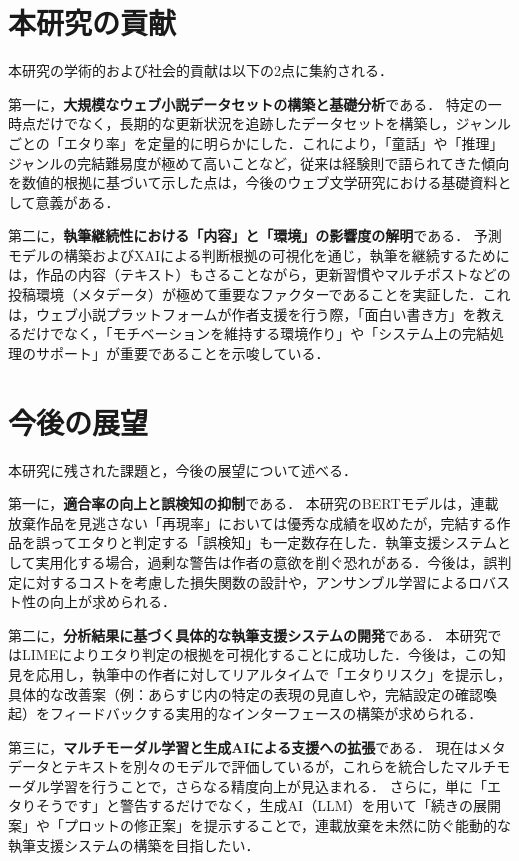 \documentclass[uplatex, dvipdfmx, 11pt, a4paper, report]{jsbook}
\begin{document}
\section{本研究の貢献}
本研究の学術的および社会的貢献は以下の2点に集約される．

第一に，\textbf{大規模なウェブ小説データセットの構築と基礎分析}である．
特定の一時点だけでなく，長期的な更新状況を追跡したデータセットを構築し，ジャンルごとの「エタり率」を定量的に明らかにした．これにより，「童話」や「推理」ジャンルの完結難易度が極めて高いことなど，従来は経験則で語られてきた傾向を数値的根拠に基づいて示した点は，今後のウェブ文学研究における基礎資料として意義がある．

第二に，\textbf{執筆継続性における「内容」と「環境」の影響度の解明}である．
予測モデルの構築およびXAIによる判断根拠の可視化を通じ，執筆を継続するためには，作品の内容（テキスト）もさることながら，更新習慣やマルチポストなどの投稿環境（メタデータ）が極めて重要なファクターであることを実証した．これは，ウェブ小説プラットフォームが作者支援を行う際，「面白い書き方」を教えるだけでなく，「モチベーションを維持する環境作り」や「システム上の完結処理のサポート」が重要であることを示唆している．

\section{今後の展望}
本研究に残された課題と，今後の展望について述べる．

第一に，\textbf{適合率の向上と誤検知の抑制}である．
本研究のBERTモデルは，連載放棄作品を見逃さない「再現率」においては優秀な成績を収めたが，完結する作品を誤ってエタりと判定する「誤検知」も一定数存在した．執筆支援システムとして実用化する場合，過剰な警告は作者の意欲を削ぐ恐れがある．今後は，誤判定に対するコストを考慮した損失関数の設計や，アンサンブル学習によるロバスト性の向上が求められる．

第二に，\textbf{分析結果に基づく具体的な執筆支援システムの開発}である．
本研究ではLIMEによりエタり判定の根拠を可視化することに成功した．今後は，この知見を応用し，執筆中の作者に対してリアルタイムで「エタりリスク」を提示し，具体的な改善案（例：あらすじ内の特定の表現の見直しや，完結設定の確認喚起）をフィードバックする実用的なインターフェースの構築が求められる．

第三に，\textbf{マルチモーダル学習と生成AIによる支援への拡張}である．
現在はメタデータとテキストを別々のモデルで評価しているが，これらを統合したマルチモーダル学習を行うことで，さらなる精度向上が見込まれる．
さらに，単に「エタりそうです」と警告するだけでなく，生成AI（LLM）を用いて「続きの展開案」や「プロットの修正案」を提示することで，連載放棄を未然に防ぐ能動的な執筆支援システムの構築を目指したい．
\end{document}
